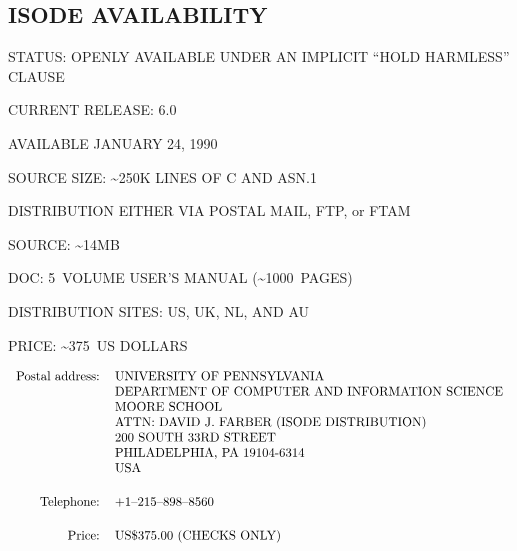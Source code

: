 


\begin{bwslide}
\part*	{ISODE AVAILABILITY}\bf

\begin{nrtc}
\item	STATUS: OPENLY AVAILABLE UNDER AN IMPLICIT ``HOLD HARMLESS'' CLAUSE

\item	CURRENT RELEASE: 6.0
    \begin{nrtc}
    \item	AVAILABLE JANUARY 24, 1990
    \end{nrtc}

\item	SOURCE SIZE: \~{}250K LINES OF C AND ASN.1
\end{nrtc}
\end{bwslide}


\begin{bwslide}

\begin{nrtc}
\item	DISTRIBUTION EITHER VIA POSTAL MAIL, FTP, or FTAM
    \begin{nrtc}
    \item	SOURCE: \~{}14MB

    \item	DOC: 5~VOLUME USER'S MANUAL (\~{}1000~PAGES)

    \item	DISTRIBUTION SITES: US, UK, NL, AND AU

    \item	PRICE: \~{}375~US DOLLARS
    \end{nrtc}
\end{nrtc}
\end{bwslide}


\begin{bwslide}
\small

\[\begin{tabular}{rl}
Postal address:&UNIVERSITY OF PENNSYLVANIA\\
&		DEPARTMENT OF COMPUTER AND INFORMATION SCIENCE\\
&		MOORE SCHOOL\\
&		ATTN: DAVID J. FARBER (ISODE DISTRIBUTION)\\
&		200 SOUTH 33RD STREET\\
&		PHILADELPHIA, PA 19104-6314\\
&		USA\\[0.2in]
Telephone:&	+1--215--898--8560\\[0.2in]
Price:&		US\$375.00 (CHECKS ONLY)
\end{tabular}\]
\end{bwslide}


